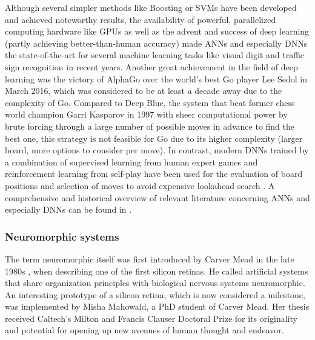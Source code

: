 Although several simpler methods like Boosting \cite{Freund1997} or \acp{SVM} \cite{Vapnik1995} have been developed and achieved noteworthy results, the availability of powerful, parallelized computing hardware like \acp{GPU} as well as the advent and success  of deep learning (partly achieving better-than-human accuracy) made \acp{ANN} \cite{Rojas1996} and especially \acp{DNN} \cite{LeCun2015} the state-of-the-art for several machine learning tasks like visual digit \cite{Ciresan2012a} and traffic sign \cite{Ciresan2012} recognition in recent years.
Another great achievement in the field of deep learning was the victory of AlphaGo \cite{Silver2016} over the world's best Go player Lee Sedol in March 2016, which was considered to be at least a decade away due to the complexity of Go.
Compared to Deep Blue, the system that beat former chess world champion Garri Kasparov in 1997 \cite{Hsu2002} with sheer computational power by brute forcing through a large number of possible moves in advance to find the best one, this strategy is not feasible for Go due to its higher complexity (larger board, more options to consider per move).
In contrast, modern \acp{DNN} trained by a combination of supervised learning from human expert games and reinforcement learning from self-play have been used for the evaluation of board positions and selection of moves to avoid expensive lookahead search \cite{Silver2016}.
A comprehensive and historical overview of relevant literature concerning \acp{ANN} and especially \acp{DNN} can be found in \cite{Schmidhuber2015, LeCun2015}.

\subsubsection{Neuromorphic systems}

The term neuromorphic itself was first introduced by Carver Mead in the late 1980s \cite{Mead90}, when describing one of the first silicon retinas.
He called artificial systems that share organization principles with biological nervous systems neuromorphic.
An interesting prototype of a silicon retina, which is now considered a milestone, was implemented by Misha Mahowald, a PhD student of Carver Mead.
Her thesis received Caltech's Milton and Francis Clauser Doctoral Prize for its originality and potential for opening up new avenues of human thought and endeavor.

